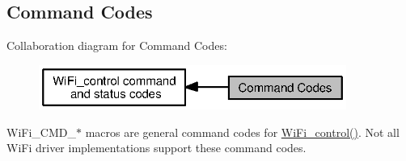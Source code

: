 \subsection{Command Codes}
\label{group___wi_fi___c_m_d}
Collaboration diagram for Command Codes\+:
\nopagebreak
\begin{figure}[H]
\begin{center}
\leavevmode
\includegraphics[width=285pt]{group___wi_fi___c_m_d}
\end{center}
\end{figure}
Wi\+Fi\+\_\+\+C\+M\+D\+\_\+$\ast$ macros are general command codes for \hyperlink{_wi_fi_8h_a1f42a1e174ed1682b7de43ec6f043bf7}{Wi\+Fi\+\_\+control()}. Not all Wi\+Fi driver implementations support these command codes. 